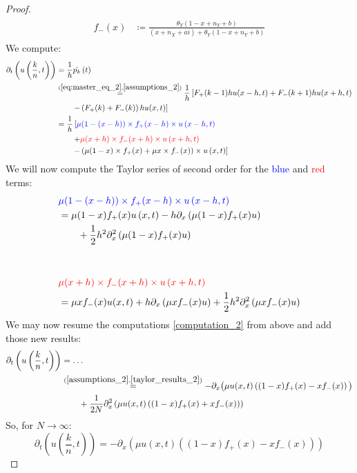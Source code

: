 \begin{proof}
\begin{align}
\begin{split}
	f_-(x) &\coloneqq \frac{\theta_Y(1-x+n_Y+b)}{(x+n_X+ai) + \theta_Y(1-x+n_Y+b)}
	\end{split}
	\end{align}
	We compute:
	\begin{align}\label{computation_2}
	\begin{split}
	\partial_t \left(u\left(\frac{k}{n}, t\right)\right) &= \frac{1}{h}\dot{p_k}\left(t\right)\\
	&\overset{(\ref{eq:master_eq_2},\ref{assumptions_2})}{=} \frac{1}{h}\left[F_+(k-1)hu(x-h,t) + F_-(k+1)hu(x+h,t)\right.\\
		&\qquad\left. - \left(F_+(k)+F_-(k)\right)hu(x,t)\right]\\
	&= \frac{1}{h}\left[\textcolor{blue}{\mu(1-(x-h))\times f_+(x-h) \times u\left(x-h,t \right)}\right.\\
		&\qquad\left. + \textcolor{red}{\mu(x+h)\times f_-(x+h)\times u\left(x+h,t\right)}\right.\\
		&\qquad\left.- \left(\mu(1-x)\times f_+(x) + \mu x\times f_-(x)\right)\times u\left(x,t\right)\right] 
	\end{split}
	\end{align}
	We will now compute the Taylor series of second order for the \textcolor{blue}{blue} and \textcolor{red}{red} terms:
	\begin{align}\label{taylor_results_2}
	\begin{split}
	&\textcolor{blue}{\mu(1-(x-h))\times f_+(x-h) \times u\left(x-h,t \right)}\\
	&= \mu(1-x)f_+(x) u\left(x,t\right) - h\partial_x \left(\mu(1-x)f_+(x)u\right)\\
		&\qquad +\frac{1}{2}h^2\partial^2_x\left(\mu(1-x)f_+(x)u\right)\\
	&\\
	&\\
	&\textcolor{red}{\mu(x+h)\times f_-(x+h) \times u\left(x+h,t\right)} \\
	&= \mu x f_-(x)u(x,t) + h\partial_x \left(\mu x f_-(x) u\right) + \frac{1}{2}h^2\partial^2_x\left(\mu xf_-(x) u\right)
	\end{split}
	\end{align}
	We may now resume the computations \eqref{computation_2} from above and add those new results:
	\begin{align*}
	\partial_t \left(u\left(\frac{k}{n}, t\right)\right) &= \dots \\
	&\overset{(\ref{assumptions_2}, \ref{taylor_results_2})}{=} -\partial_x\big(\mu u(x,t)\left((1-x)f_+(x) - xf_-(x)\right)\big)\\
	&\qquad + \frac{1}{2N} \partial^2_x\left(\mu u(x,t)\left((1-x)f_+(x) + xf_-(x)\right)\right)\\
	\end{align*}
	So, for $N \rightarrow \infty$:
	\begin{equation}
		\partial_t \left(u\left(\frac{k}{n}, t\right)\right) = -\partial_x\left(\mu u(x,t)\left((1-x)f_+(x) - xf_-(x)\right)\right)
	\end{equation}


\end{proof}
